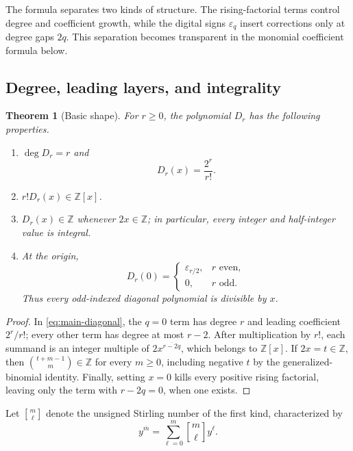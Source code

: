 \documentclass[11pt,oneside]{article}
\numberwithin{equation}{section}
\newtheorem{theorem}{Theorem}[section]
\theoremstyle{definition}
\theoremstyle{remark}
\newcommand{\Z}{\mathbb Z}
\newcommand{\eps}{\varepsilon}
\newcommand{\rising}[2]{#1^{\overline{#2}}}
\newcommand{\Diag}{D}
\newcommand{\stirlingfirst}[2]{\genfrac{[}{]}{0pt}{}{#1}{#2}}
\begin{document}
The formula separates two kinds of structure.  The rising-factorial terms
control degree and coefficient growth, while the digital signs \(\eps_q\)
insert corrections only at degree gaps \(2q\).  This separation becomes
transparent in the monomial coefficient formula below.

\subsection{Degree, leading layers, and integrality}

\begin{theorem}[Basic shape]
For \(r\ge0\), the polynomial \(\Diag_r\) has the following properties.
\begin{enumerate}
\item \(\deg \Diag_r=r\) and
\begin{equation}
 [x^r]\Diag_r(x)=\frac{2^r}{r!}.
 \label{eq:leading-coefficient}
\end{equation}
\item \(r!\Diag_r(x)\in\Z[x]\).
\item \(\Diag_r(x)\in\Z\) whenever \(2x\in\Z\); in particular, every
integer and half-integer value is integral.
\item At the origin,
\begin{equation}
 \Diag_r(0)=
 \begin{cases}
 \eps_{r/2},&r\text{ even},\\
 0,&r\text{ odd}.
 \end{cases}
 \label{eq:origin-values}
\end{equation}
Thus every odd-indexed diagonal polynomial is divisible by \(x\).
\end{enumerate}
\end{theorem}

\begin{proof}
In \eqref{eq:main-diagonal}, the \(q=0\) term has degree \(r\) and leading
coefficient \(2^r/r!\); every other term has degree at most \(r-2\).  After
multiplication by \(r!\), each summand is an integer multiple of
\(\rising{2x}{r-2q}\), which belongs to \(\Z[x]\).  If \(2x=t\in\Z\), then
\(\binom{t+m-1}{m}\in\Z\) for every \(m\ge0\), including negative \(t\) by
the generalized-binomial identity.  Finally, setting \(x=0\) kills every
positive rising factorial, leaving only the term with \(r-2q=0\), when one
exists.
\end{proof}

Let \(\stirlingfirst{m}{\ell}\) denote the unsigned Stirling number of
the first kind, characterized by
\begin{equation}
 \rising{y}{m}=\sum_{\ell=0}^{m}
 \stirlingfirst{m}{\ell}y^\ell.
 \label{eq:stirling-rising}
\end{equation}
\end{document}
